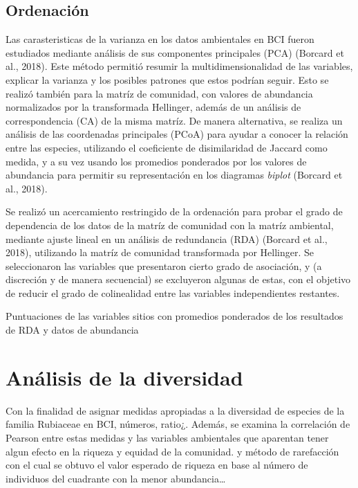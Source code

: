 \documentclass[11pt,]{article}
\begin{document}
\subsection{Ordenación}\label{ordenaciuxf3n}

Las carasteristicas de la varianza en los datos ambientales en BCI
fueron estudiados mediante análisis de sus componentes principales (PCA)
(Borcard et al., 2018). Este método permitió resumir la
multidimensionalidad de las variables, explicar la varianza y los
posibles patrones que estos podrían seguir. Esto se realizó también para
la matríz de comunidad, con valores de abundancia normalizados por la
transformada Hellinger, además de un análisis de correspondencia (CA) de
la misma matríz. De manera alternativa, se realiza un análisis de las
coordenadas principales (PCoA) para ayudar a conocer la relación entre
las especies, utilizando el coeficiente de disimilaridad de Jaccard como
medida, y a su vez usando los promedios ponderados por los valores de
abundancia para permitir su representación en los diagramas
\emph{biplot} (Borcard et al., 2018).

Se realizó un acercamiento restringido de la ordenación para probar el
grado de dependencia de los datos de la matríz de comunidad con la
matríz ambiental, mediante ajuste lineal en un análisis de redundancia
(RDA) (Borcard et al., 2018), utilizando la matríz de comunidad
transformada por Hellinger. Se seleccionaron las variables que
presentaron cierto grado de asociación, y (a discreción y de manera
secuencial) se excluyeron algunas de estas, con el objetivo de reducir
el grado de colinealidad entre las variables independientes restantes.

Puntuaciones de las variables sitios con promedios ponderados de los
resultados de RDA y datos de abundancia

\section{Análisis de la diversidad}\label{anuxe1lisis-de-la-diversidad}

Con la finalidad de asignar medidas apropiadas a la diversidad de
especies de la familia Rubiaceae en BCI, números, ratio¿. Además, se
examina la correlación de Pearson entre estas medidas y las variables
ambientales que aparentan tener algun efecto en la riqueza y equidad de
la comunidad. y método de rarefacción con el cual se obtuvo el valor
esperado de riqueza en base al número de individuos del cuadrante con la
menor abundancia\ldots{}
\end{document}
